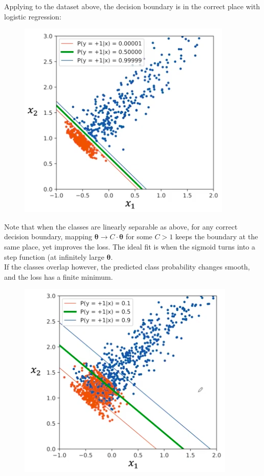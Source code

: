 \newpage
Applying to the dataset above, the decision boundary is in the correct place with logistic regression:
\begin{figure}[H]
\centering
\includegraphics[scale=0.4]{decisionboundary2.png}
\end{figure}
Note that when the classes are linearly separable as above, for any correct decision boundary, mapping $\pmb{\theta} \rightarrow C \cdot \pmb{\theta}$ for some $C > 1$ keeps the boundary at the same place, yet improves the loss. The ideal fit is when the sigmoid turns into a step function (at infinitely large $\pmb{\theta}$.\\

If the classes overlap however, the predicted class probability changes smooth, and the loss has a finite minimum.

\begin{figure}[H]
\centering
\includegraphics[scale=0.4]{decisionboundary3.png}
\end{figure}



